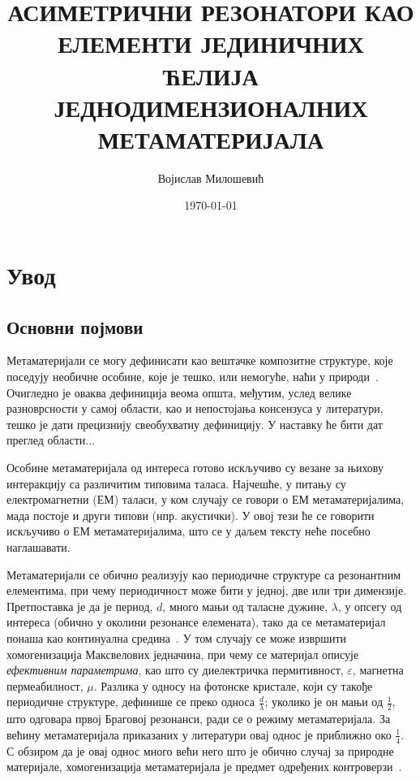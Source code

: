 \documentclass[12pt,oneside]{book}
\title{АСИМЕТРИЧНИ РЕЗОНАТОРИ КАО ЕЛЕМЕНТИ ЈЕДИНИЧНИХ ЋЕЛИЈА ЈЕДНОДИМЕНЗИОНАЛНИХ МЕТАМАТЕРИЈАЛА}
\date{\today}
\author{Војислав Милошевић}
\begin{document}
\chapter{Увод}

\section{Основни појмови}

Метаматеријали се могу дефинисати као вештачке композитне структуре, које поседују необичне особине, које је тешко, или немогуће, наћи у природи~\cite{Sham:09}. Очигледно је оваква дефиниција веома општа, међутим, услед велике разноврсности у самој области, као и непостојања консензуса у литератури, тешко је дати прецизнију свеобухватну дефиницију. У наставку ће бити дат преглед области...%

Особине метаматеријала од интереса готово искључиво су везане за њихову интеракцију са различитим типовима таласа. Најчешће, у питању су електромагнетни (ЕМ) таласи, у ком случају се говори о ЕМ метаматеријалима, мада постоје и други типови (нпр. акустички). У овој тези ће се говорити искључиво о ЕМ метаматеријалима, што се у даљем тексту неће посебно наглашавати.

Метаматеријали се обично реализују као периодичне структуре са резонантним елементима, при чему периодичност може бити у једној, две или три димензије. Претпоставка је да је период, $d$, много мањи од таласне дужине, $\lambda$, у опсегу од интереса (обично у околини резонансе елемената), тако да се метаматеријал понаша као континуална средина~\cite{landau1982}. У том случају се може извршити хомогенизација Максвелових једначина, при чему се материјал описује \emph{ефективним параметрима}, као што су диелектричка пермитивност, $\varepsilon$, магнетна пермеабилност, $\mu$. Разлика у односу на фотонске кристале, који су такође периодичне структуре, дефинише се преко односа $\frac{d}{\lambda}$; уколико је он мањи од $\frac{1}{2}$, што одговара првој Браговој резонанси, ради се о режиму метаматеријала. За већину метаматеријала приказаних у литератури овај однос је приближно око $\frac{1}{4}$. С обзиром да је овај однос много већи него што је обично случај за природне материјале, хомогенизација метаматеријала је предмет одређених контроверзи~\cite{simovski}.
\end{document}
